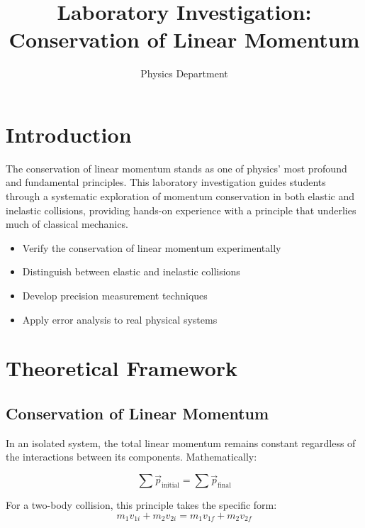 \documentclass[12pt]{article}
\newcommand{\conceptbox}[2]{
    \begin{tcolorbox}[colback=blue!5,colframe=blue!40,title={\textbf{#1}}]
        #2
    \end{tcolorbox}
}
\begin{document}
\title{\textbf{Laboratory Investigation:\\ Conservation of Linear Momentum}}
\author{Physics Department}
\date{}
\maketitle

\section*{Introduction}
The conservation of linear momentum stands as one of physics' most profound and fundamental principles. This laboratory investigation guides students through a systematic exploration of momentum conservation in both elastic and inelastic collisions, providing hands-on experience with a principle that underlies much of classical mechanics.

\conceptbox{Core Learning Objectives}{
\begin{itemize}
    \item Verify the conservation of linear momentum experimentally
    \item Distinguish between elastic and inelastic collisions
    \item Develop precision measurement techniques
    \item Apply error analysis to real physical systems
\end{itemize}
}

\section{Theoretical Framework}

\subsection{Conservation of Linear Momentum}
In an isolated system, the total linear momentum remains constant regardless of the interactions between its components. Mathematically:

\begin{equation}
    \sum \vec{p}_{\text{initial}} = \sum \vec{p}_{\text{final}}
\end{equation}

For a two-body collision, this principle takes the specific form:
\begin{equation}
    m_1v_{1i} + m_2v_{2i} = m_1v_{1f} + m_2v_{2f}
\end{equation}
\end{document}
